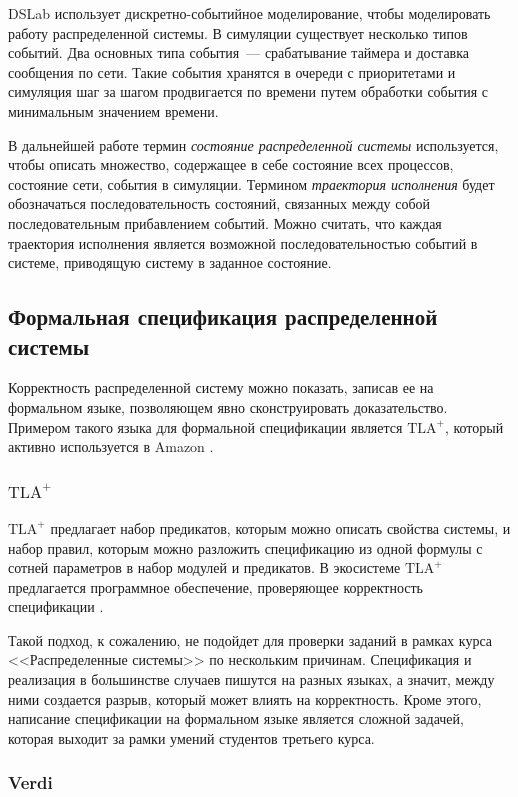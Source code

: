 \documentclass[a4paper,12pt]{extarticle}
\begin{document}
DSLab использует дискретно-событийное моделирование, чтобы моделировать работу распределенной системы.
В симуляции существует несколько типов событий.
Два основных типа события~--- срабатывание таймера и доставка сообщения по сети.
Такие события хранятся в очереди с приоритетами и симуляция шаг за шагом продвигается по времени путем обработки события с минимальным значением времени.

В дальнейшей работе термин \textit{состояние распределенной системы} используется, чтобы описать множество, содержащее в себе состояние всех процессов, состояние сети, события в симуляции.
Термином \textit{траектория исполнения} будет обозначаться последовательность состояний, связанных между собой последовательным прибавлением событий.
Можно считать, что каждая траектория исполнения является возможной последовательностью событий в системе, приводящую систему в заданное состояние.

\subsection{Формальная спецификация распределенной системы}

Корректность распределенной систему можно показать, записав ее на формальном языке, позволяющем явно сконструировать доказательство.
Примером такого языка для формальной спецификации является $\text{TLA}^+$, который активно используется в Amazon \cite{b31, b4}.

\subsubsection{$\text{TLA}^+$}

$\text{TLA}^+$ предлагает набор предикатов, которым можно описать свойства системы, и набор правил, которым можно разложить спецификацию из одной формулы с сотней параметров в набор модулей и предикатов.
В экосистеме $\text{TLA}^+$ предлагается программное обеспечение, проверяющее корректность спецификации \cite{b33}.

Такой подход, к сожалению, не подойдет для проверки заданий в рамках курса <<Распределенные системы>> по нескольким причинам.
Спецификация и реализация в большинстве случаев пишутся на разных языках, а значит, между ними создается разрыв, который может влиять на корректность.
Кроме этого, написание спецификации на формальном языке является сложной задачей, которая выходит за рамки умений студентов третьего курса.

\subsubsection{Verdi}
\end{document}
